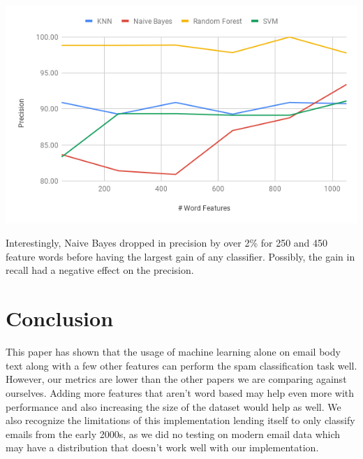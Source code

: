 \documentclass[12pt]{article}
\newenvironment{Figure}
  {\par\medskip\noindent\minipage{\linewidth}}
  {\endminipage\par\medskip}
\begin{document}
\begin{multicols}{2}
                \begin{Figure}
                    \centering
                    \includegraphics[width=\linewidth]{figures/precision_wv_effect.png}
                    \label{fig:precision_word_effect}
                \end{Figure}

                Interestingly, Naive Bayes dropped in precision by over 2\% 
                for 250 and 450 feature words before having the largest gain of any classifier. 
                Possibly, the gain in recall had a negative effect on the precision.
                
        \section{Conclusion}

            This paper has shown that the usage of machine learning alone on email body text 
            along with a few other features can perform the spam classification task well. 
            However, our metrics are lower
            than the other papers we are comparing against ourselves. Adding more features
            that aren't word based may help even more with performance and also increasing the
            size of the dataset would help as well. We also recognize the limitations of
            this implementation lending itself to only classify emails from the early 2000s, as
            we did no testing on modern email data which may have a distribution that doesn't
            work well with our implementation.
        \nocite{*}
         
        
    \end{multicols}
\end{document}
